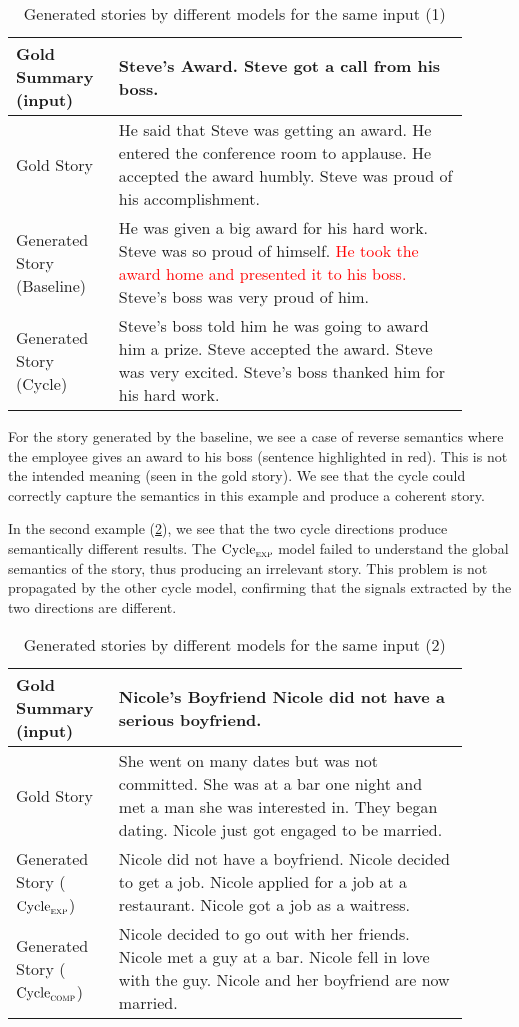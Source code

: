 \begin{table}[h]
\centering
\begin{tabular}{p{0.2\linewidth} | p{0.7\linewidth}}
Gold Summary (input)  & Steve's Award. Steve got a call from his boss. \\ \hline
Gold Story & He said that Steve was getting an award. He entered the conference room to applause. He accepted the award humbly. Steve was proud of his accomplishment. \\ \hline
Generated Story (Baseline) & He was given a big award for his hard work. Steve was so proud of himself. \textcolor{red}{He took the award home and presented it to his boss.} Steve's boss was very proud of him. \\ \hline
Generated Story (Cycle) & Steve's boss told him he was going to award him a prize. Steve accepted the award. Steve was very excited. Steve's boss thanked him for his hard work.
\end{tabular}
\caption{Generated stories by different models for the same input (1)}
\label{tab:comp-sample-1}
\end{table}

For the story generated by the baseline, we see a case of reverse semantics where the employee gives an award to his boss (sentence highlighted in red). This is not the intended meaning (seen in the gold story). We see that the cycle could correctly capture the semantics in this example and produce a coherent story.

In the second example (\cref{tab:comp-sample-2}), we see that the two cycle directions produce semantically different results. The $\text{Cycle}_{\textsc{exp}}$ model failed to understand the global semantics of the story, thus producing an irrelevant story. This problem is not propagated by the other cycle model, confirming that the signals extracted by the two directions are different.

\begin{table}[h]
\centering
\begin{tabular}{p{0.2\linewidth} | p{0.7\linewidth}}
Gold Summary (input)  & Nicole's Boyfriend Nicole did not have a serious boyfriend. \\ \hline
Gold Story & She went on many dates but was not committed. She was at a bar one night and met a man she was interested in. They began dating. Nicole just got engaged to be married. \\ \hline
Generated Story ($\text{Cycle}_{\textsc{exp}}$) & Nicole did not have a boyfriend. Nicole decided to get a job. Nicole applied for a job at a restaurant. Nicole got a job as a waitress. \\ \hline
Generated Story ($\text{Cycle}_{\textsc{comp}}$) & Nicole decided to go out with her friends. Nicole met a guy at a bar. Nicole fell in love with the guy. Nicole and her boyfriend are now married.
\end{tabular}
\caption{Generated stories by different models for the same input (2)}
\label{tab:comp-sample-2}
\end{table}

